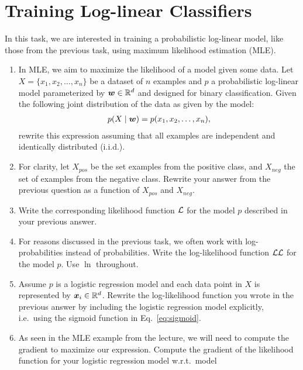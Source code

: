 \documentclass[11pt,a4paper]{article}
\begin{document}
\section{Training Log-linear Classifiers}

In this task, we are interested in training a probabilistic log-linear model,
like those from the previous task, using maximum likelihood estimation (MLE).

\begin{enumerate}[label=(\alph*)]
    \item In MLE, we aim to maximize the likelihood of a model given some data.
          Let $X=\{x_1, x_2, \ldots, x_n\}$ be a dataset of $n$ examples and
          $p$ a probabilistic log-linear model parameterized by ${\boldsymbol{w}}\in\mathbb{R}^d$
          and designed for binary classification.
          Given the following joint distribution of the data as given by the
          model:
          \begin{align}
              p(X\mid{\boldsymbol{w}}) = p(x_1, x_2, \ldots, x_n),
          \end{align}
          rewrite this expression assuming that all examples are independent and
          identically distributed (i.i.d.).
    \item For clarity, let $X_{pos}$ be the set examples from the positive class,
          and $X_{neg}$ the set of examples from the negative class.
          Rewrite your answer from the previous question as a function of
          $X_{pos}$ and $X_{neg}$.
    \item Write the corresponding likelihood function $\mathcal{L}$ for the model
          $p$ described in your previous answer.
    \item For reasons discussed in the previous task, we often work with
          log-probabilities instead of probabilities.
          Write the log-likelihood function $\mathcal{LL}$ for the model $p$.
          Use $\ln$ throughout.
    \item Assume $p$ is a logistic regression model and each data point in $X$
          is represented by ${\boldsymbol{x}}_i\in\mathbb{R}^d$.
          Rewrite the log-likelihood function you wrote in the previous answer
          by including the logistic regression model explicitly, i.e.\ using the
          sigmoid function in Eq.~\ref{eq:sigmoid}.
    \item As seen in the MLE example from the lecture, we will need to compute
          the gradient to maximize our expression. Compute the gradient of the
          likelihood function for your logistic regression model w.r.t.\ model

\end{enumerate}
\end{document}
